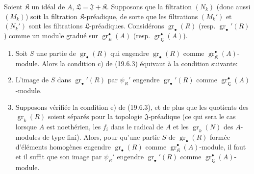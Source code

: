 \begin{corollary}[19.6.4]
\label{IV.19.6.4}
Soient $\mathfrak K$ un idéal de $A$, $\mathfrak L=\mathfrak J+\mathfrak K$. Supposons que la filtration $(N_k)$ (donc aussi $(M_k)$) soit la filtration $\mathfrak K$-préadique, de sorte que les filtrations $(M_k')$ et $(N_k')$ sont les filtrations $\mathfrak L$-préadiques. Considérons $\operatorname{gr}_\bullet(R)$ \textup{(resp. $\operatorname{gr}_\bullet'(R)$)} comme un module gradué sur $\operatorname{gr}_{\mathfrak K}^\bullet(A)$ \textup{(resp. $\operatorname{gr}_{\mathfrak L}^\bullet(A)$)}.
\begin{enumerate}
  \item[\textup{(i)}] Soit $S$ une partie de $\operatorname{gr}_\bullet(R)$ qui engendre $\operatorname{gr}_\bullet(R)$ comme $\operatorname{gr}_{\mathfrak K}^\bullet(A)$-module. Alors la condition \textup{c)} de \textup{(19.6.3)} équivaut à la condition suivante:
  \item[\textup{c$'$)}] L'image de $S$ dans $\operatorname{gr}_\bullet'(R)$ par $\psi_R'$ engendre $\operatorname{gr}_\bullet'(R)$ comme $\operatorname{gr}_{\mathfrak L}^\bullet(A)$-module.
  \item[\textup{(ii)}] Supposons vérifiée la condition \textup{e)} de \textup{(19.6.3)}, et de plus que les quotients des $\operatorname{gr}_k(R)$ soient séparés pour la topologie $\mathfrak J$-préadique \textup{(ce qui sera le cas lorsque $A$ est noethérien, les $f_i$ dans le radical de $A$ et les $\operatorname{gr}_k(N)$ des $A$-modules de type fini)}. Alors, pour qu'une partie $S$ de $\operatorname{gr}_\bullet(R)$ formée d'éléments homogènes engendre $\operatorname{gr}_\bullet(R)$ comme $\operatorname{gr}_{\mathfrak K}^\bullet(A)$-module, il faut et il suffit que son image par $\psi_R'$ engendre $\operatorname{gr}_\bullet'(R)$ comme $\operatorname{gr}_{\mathfrak L}^\bullet(A)$-module.
\end{enumerate}
\end{corollary}


